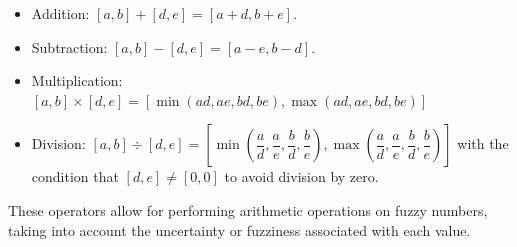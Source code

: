 \documentclass[12pt, a4paper]{report}
\begin{document}
    \begin{itemize}
        \item Addition: $[a,b]+[d,e]=[a+d,b+e]$.
        \item Subtraction: $[a,b]-[d,e]=[a-e,b-d]$.
        \item Multiplication:  $[a,b] \times [d,e]=[\min (ad,ae,bd,be),\max (ad,ae,bd,be)]$
        \item Division: $[a,b] \div [d,e]=\left[\min \left(\dfrac{a}{d},\dfrac{a}{e},\dfrac{b}{d},\dfrac{b}{e}\right),\max \left(\dfrac{a}{d},\dfrac{a}{e},\dfrac{b}{d},\dfrac{b}{e}\right)\right]$ with the condition that $[d,e] \neq [0,0]$ to avoid division by zero.
    \end{itemize}
    These operators allow for performing arithmetic operations on fuzzy numbers, taking into account the uncertainty or fuzziness associated with each value.
\end{document}
